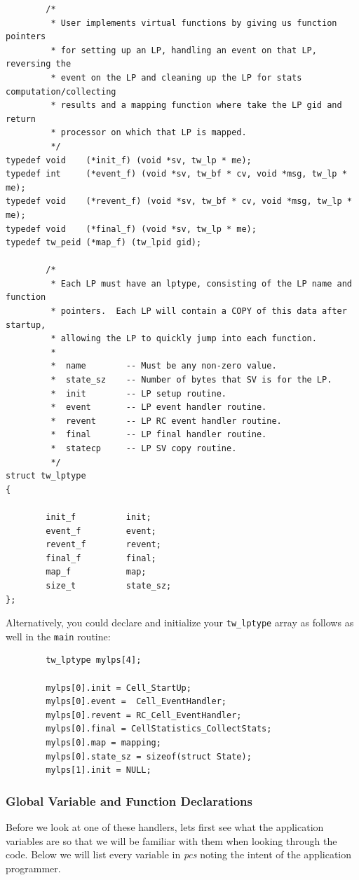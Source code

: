 \documentclass[12pt]{article}
\begin{document}
\begin{verbatim}
        /*
         * User implements virtual functions by giving us function pointers
         * for setting up an LP, handling an event on that LP, reversing the
         * event on the LP and cleaning up the LP for stats computation/collecting
         * results and a mapping function where take the LP gid and return 
         * processor on which that LP is mapped.
         */
typedef void    (*init_f) (void *sv, tw_lp * me);
typedef int     (*event_f) (void *sv, tw_bf * cv, void *msg, tw_lp * me);
typedef void    (*revent_f) (void *sv, tw_bf * cv, void *msg, tw_lp * me);
typedef void    (*final_f) (void *sv, tw_lp * me);
typedef tw_peid (*map_f) (tw_lpid gid);

        /*
         * Each LP must have an lptype, consisting of the LP name and function
         * pointers.  Each LP will contain a COPY of this data after startup,
         * allowing the LP to quickly jump into each function.
         *
         *  name        -- Must be any non-zero value.
         *  state_sz    -- Number of bytes that SV is for the LP.
         *  init        -- LP setup routine.
         *  event       -- LP event handler routine.
         *  revent      -- LP RC event handler routine.
         *  final       -- LP final handler routine.
         *  statecp     -- LP SV copy routine.
         */
struct tw_lptype
{

        init_f          init;
        event_f         event;
        revent_f        revent;
        final_f         final;
        map_f           map;
        size_t          state_sz;
};
\end{verbatim}

Alternatively, you could declare and initialize your {\tt tw\_lptype}
array as follows as well in the {\tt main} routine:

\begin{verbatim}
        tw_lptype mylps[4];

        mylps[0].init = Cell_StartUp;
        mylps[0].event =  Cell_EventHandler;
        mylps[0].revent = RC_Cell_EventHandler;
        mylps[0].final = CellStatistics_CollectStats;
        mylps[0].map = mapping;
        mylps[0].state_sz = sizeof(struct State);
        mylps[1].init = NULL;
\end{verbatim}

\subsubsection{ Global Variable and Function Declarations}
Before we look at one of these handlers, lets first see what the application
variables are so that we will be familiar with them when looking through the
code.  Below we will list every variable in {\em pcs} noting the intent of the
application programmer.
\end{document}
